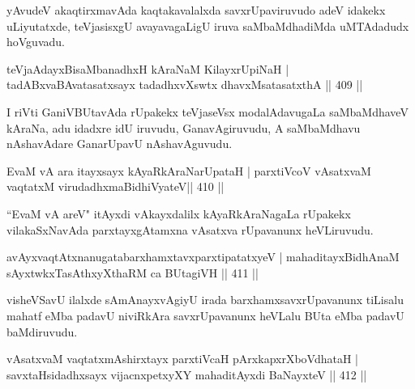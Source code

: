 \begin{artha}
yAvudeV akaqtirxmavAda kaqtakavalalxda savxrUpaviruvudo adeV idakekx uLiyutatxde, teVjasisxgU avayavagaLigU iruva saMbaMdhadiMda uMTAdadudx hoVguvadu.
\end{artha}

\begin{shl}
teVjaAdayxBisaMbanadhxH kAraNaM KilayxrUpiNaH |
tadABxvaBAvatasatxsayx tadadhxvXswtx dhavxMsatasatxthA \hfill || 409 ||
\end{shl}

\begin{artha}
I riVti GaniVBUtavAda rUpakekx teVjaseVsx modalAdavugaLa saMbaMdhaveV kAraNa, adu idadxre idU iruvudu, GanavAgiruvudu, A saMbaMdhavu nAshavAdare GanarUpavU nAshavAguvudu.
\end{artha}


\begin{shl}
EvaM vA ara itayxsayx kAyaRkAraNarUpataH |
parxtiVcoV vAsatxvaM vaqtatxM virudadhxmaBidhiVyateV\hfill || 410 ||
\end{shl}

\begin{artha}
``EvaM vA areV" itAyxdi vAkayxdalilx kAyaRkAraNagaLa rUpakekx vilakaSxNavAda parxtayxgAtamxna vAsatxva rUpavanunx heVLiruvudu.
\end{artha}


\begin{shl}
avAyxvaqtAtxnanugatabarxhamxtavxparxtipatatxyeV |
mahaditayxBidhAnaM sAyxtwkxTasAthxyXthaRM ca BUtagiVH \hfill || 411 ||
\end{shl}

\begin{artha}
visheVSavU ilalxde sAmAnayxvAgiyU irada barxhamxsavxrUpavanunx tiLisalu mahatf eMba padavU niviRkAra savxrUpavanunx heVLalu BUta eMba padavU baMdiruvudu.
\end{artha}


\begin{shl}
vAsatxvaM vaqtatxmAshirxtayx parxtiVcaH pArxkapxrXboVdhataH |
savxtaHsidadhxsayx vijacnxpetxyXY mahaditAyxdi BaNayxteV \hfill  || 412 ||
\end{shl}

